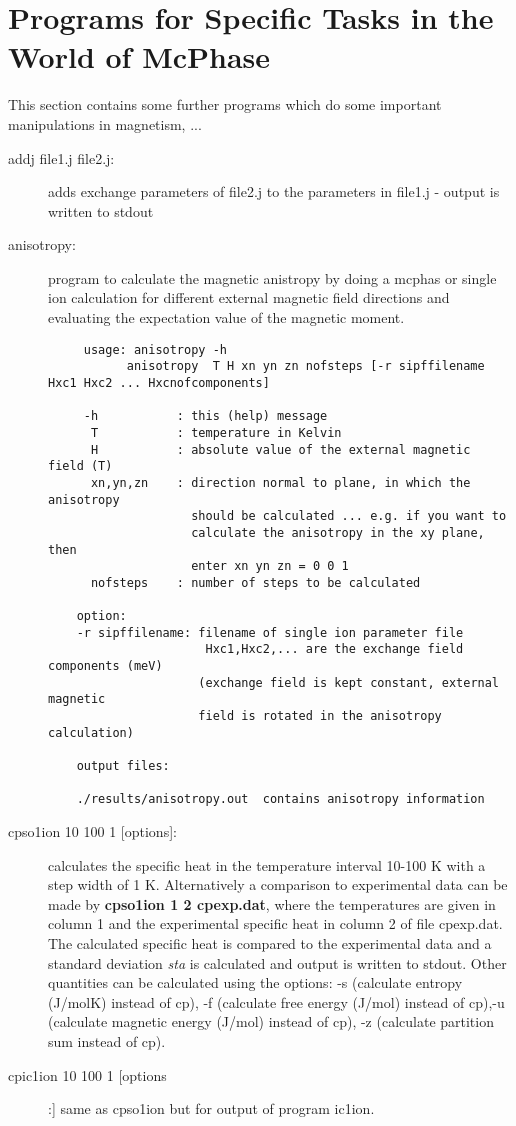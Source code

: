 \section{Programs for Specific Tasks in the World of McPhase}\label{addprog}

This section  contains some further programs which do some important manipulations
in magnetism, ...

\begin{description} 

\item [\prg addj file1.j file2.j:] adds exchange parameters of file2.j to the %
parameters in
file1.j - output is written to stdout


\item [\prg anisotropy:] program to calculate the magnetic anistropy
by doing a mcphas or
               single ion calculation for different external magnetic field
               directions and evaluating the expectation value of the magnetic 
               moment.
\begin{verbatim}
     usage: anisotropy -h
           anisotropy  T H xn yn zn nofsteps [-r sipffilename Hxc1 Hxc2 ... Hxcnofcomponents]

     -h           : this (help) message
      T           : temperature in Kelvin
      H           : absolute value of the external magnetic field (T)
      xn,yn,zn    : direction normal to plane, in which the anisotropy
                    should be calculated ... e.g. if you want to
                    calculate the anisotropy in the xy plane, then
                    enter xn yn zn = 0 0 1
      nofsteps    : number of steps to be calculated 

    option:
    -r sipffilename: filename of single ion parameter file
                      Hxc1,Hxc2,... are the exchange field components (meV)
                     (exchange field is kept constant, external magnetic
                     field is rotated in the anisotropy calculation)

    output files:

    ./results/anisotropy.out  contains anisotropy information

\end{verbatim}

\item [\prg cpso1ion 10 100 1 {[options]}: ] calculates the specific heat in the temperature %
interval 10-100 K with a step width
of 1 K. Alternatively a comparison to experimental data can be made by {\bf cpso1ion 1 2 %
cpexp.dat},
where the temperatures are given in column 1 and the experimental specific heat in column
2 of file cpexp.dat. The calculated specific heat is compared to the experimental data and
a standard deviation {\em sta} is calculated and output is written to stdout.
Other quantities can be calculated using the options: -s  (calculate entropy  (J/molK) instead %
of cp),
-f (calculate free energy (J/mol) instead of cp),-u  (calculate magnetic energy (J/mol) instead %
of cp),
-z (calculate partition sum instead of cp).
\item[\prg cpic1ion 10 100 1 [options]:] same as {\prg cpso1ion} but for output of program
ic1ion.
					  

\end{description}
